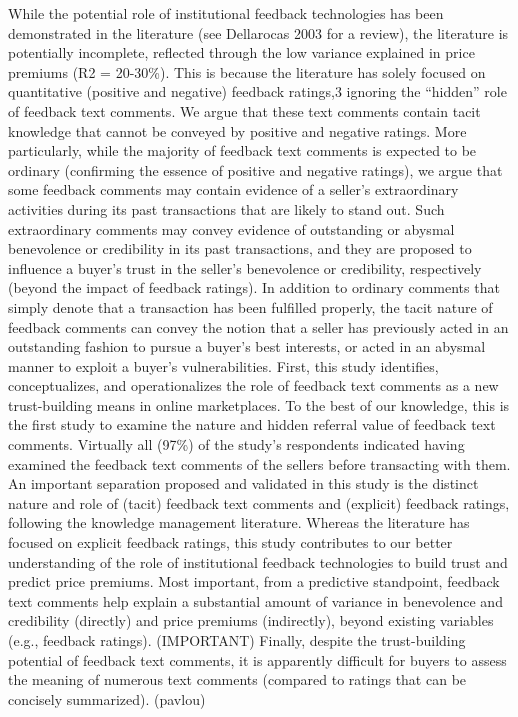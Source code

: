 \documentclass[a4paper, 11pt]{article}
\begin{document}
While the potential role of institutional feedback technologies has been demonstrated in the literature
(see Dellarocas 2003 for a review), the literature is potentially incomplete, reflected through the low variance
explained in price premiums (R2 = 20-30\%). This is because the literature has solely focused on quantitative
(positive and negative) feedback ratings,3 ignoring the “hidden” role of feedback text comments. We argue
that these text comments contain tacit knowledge that cannot be conveyed by positive and negative ratings.
More particularly, while the majority of feedback text comments is expected to be ordinary (confirming
the essence of positive and negative ratings), we argue that some feedback comments may contain evidence
of a seller’s extraordinary activities during its past transactions that are likely to stand out. Such extraordinary
comments may convey evidence of outstanding or abysmal benevolence or credibility in its past transactions,
and they are proposed to influence a buyer’s trust in the seller’s benevolence or credibility, respectively
(beyond the impact of feedback ratings). In addition to ordinary comments that simply denote that a transaction has been fulfilled properly, the
tacit nature of feedback comments can convey the notion that a seller has previously acted in an outstanding
fashion to pursue a buyer’s best interests, or acted in an abysmal manner to exploit a buyer’s vulnerabilities. First, this study identifies, conceptualizes, and operationalizes the role of feedback text comments as a
new trust-building means in online marketplaces. To the best of our knowledge, this is the first study to examine
the nature and hidden referral value of feedback text comments. Virtually all (97\%) of the study’s respondents
indicated having examined the feedback text comments of the sellers before transacting with them. An
important separation proposed and validated in this study is the distinct nature and role of (tacit) feedback text
comments and (explicit) feedback ratings, following the knowledge management literature. Whereas the
literature has focused on explicit feedback ratings, this study contributes to our better understanding of the role of institutional feedback technologies to build trust and predict price premiums. Most important, from a
predictive standpoint, feedback text comments help explain a substantial amount of variance in benevolence
and credibility (directly) and price premiums (indirectly), beyond existing variables (e.g., feedback ratings).
(IMPORTANT) Finally, despite the trust-building potential of feedback text comments, it is apparently difficult for buyers
to assess the meaning of numerous text comments (compared to ratings that can be concisely summarized). (pavlou)
\end{document}
